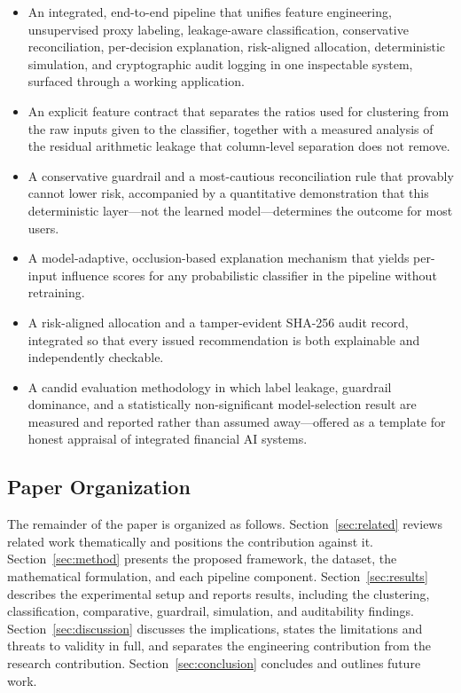 \begin{itemize}
\item[\textbf{C1)}] An integrated, end-to-end pipeline that unifies feature
  engineering, unsupervised proxy labeling, leakage-aware classification, conservative
  reconciliation, per-decision explanation, risk-aligned allocation, deterministic
  simulation, and cryptographic audit logging in one inspectable system, surfaced
  through a working application.
\item[\textbf{C2)}] An explicit feature contract that separates the ratios used for
  clustering from the raw inputs given to the classifier, together with a measured
  analysis of the residual arithmetic leakage that column-level separation does not
  remove.
\item[\textbf{C3)}] A conservative guardrail and a most-cautious reconciliation rule
  that provably cannot lower risk, accompanied by a quantitative demonstration that
  this deterministic layer---not the learned model---determines the outcome for most
  users.
\item[\textbf{C4)}] A model-adaptive, occlusion-based explanation mechanism that yields
  per-input influence scores for any probabilistic classifier in the pipeline without
  retraining.
\item[\textbf{C5)}] A risk-aligned allocation and a tamper-evident SHA-256 audit
  record, integrated so that every issued recommendation is both explainable and
  independently checkable.
\item[\textbf{C6)}] A candid evaluation methodology in which label leakage, guardrail
  dominance, and a statistically non-significant model-selection result are measured
  and reported rather than assumed away---offered as a template for honest appraisal of
  integrated financial AI systems.
\end{itemize}

\subsection{Paper Organization}\label{subsec:organization}
The remainder of the paper is organized as follows. Section~\ref{sec:related} reviews
related work thematically and positions the contribution against it.
Section~\ref{sec:method} presents the proposed framework, the dataset, the
mathematical formulation, and each pipeline component. Section~\ref{sec:results}
describes the experimental setup and reports results, including the clustering,
classification, comparative, guardrail, simulation, and auditability findings.
Section~\ref{sec:discussion} discusses the implications, states the limitations and
threats to validity in full, and separates the engineering contribution from the
research contribution. Section~\ref{sec:conclusion} concludes and outlines future work.
